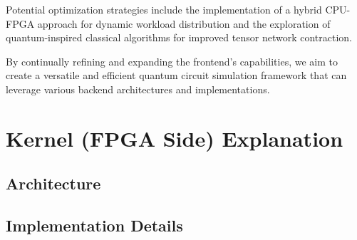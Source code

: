 \documentclass[12pt,oneside,a4paper]{article}
\begin{document}
Potential optimization strategies include the implementation of a hybrid CPU-FPGA approach for dynamic workload distribution and the exploration of quantum-inspired classical algorithms for improved tensor network contraction.

By continually refining and expanding the frontend's capabilities, we aim to create a versatile and efficient quantum circuit simulation framework that can leverage various backend architectures and implementations.



\section{Kernel (FPGA Side) Explanation}



\subsection{Architecture}

\subsection{Implementation Details}
\end{document}
